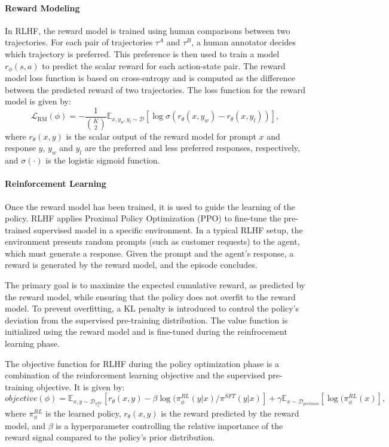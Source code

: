 \documentclass[master,english,final]{kaist-ucs}
\begin{document}
\paragraph{Reward Modeling}
In RLHF, the reward model is trained using human comparisons between two trajectories. For each pair of trajectories $\tau^A$ and $\tau^B$, a human annotator decides which trajectory is preferred. This preference is then used to train a model $r_\phi(s,a)$ to predict the scalar reward for each action-state pair. The reward model loss function is based on cross-entropy and is computed as the difference between the predicted reward of two trajectories. The loss function for the reward model is given by:
\[
\mathcal{L}_{\text{RM}}(\phi) = - \frac{1}{\binom{K}{2}} \mathbb{E}_{x, y_w, y_l \sim \mathcal{D}} \left[ \log \sigma(r_\theta(x, y_w) - r_\theta(x, y_l)) \right],
\]
where $r_\theta(x, y)$ is the scalar output of the reward model for prompt $x$ and response $y$, $y_w$ and $y_l$ are the preferred and less preferred responses, respectively, and $\sigma(\cdot)$ is the logistic sigmoid function.

\paragraph{Reinforcement Learning}
Once the reward model has been trained, it is used to guide the learning of the policy. RLHF applies Proximal Policy Optimization (PPO)\cite{schulman2017proximal} to fine-tune the pre-trained supervised model in a specific environment. In a typical RLHF setup, the environment presents random prompts (such as customer requests) to the agent, which must generate a response. Given the prompt and the agent's response, a reward is generated by the reward model, and the episode concludes.

The primary goal is to maximize the expected cumulative reward, as predicted by the reward model, while ensuring that the policy does not overfit to the reward model. To prevent overfitting, a KL penalty is introduced to control the policy's deviation from the supervised pre-training distribution. The value function is initialized using the reward model and is fine-tuned during the reinfrocement learning phase.

The objective function for RLHF during the policy optimization phase is a combination of the reinforcement learning objective and the supervised pre-training objective. It is given by:
\[
objective(\phi) = \mathbb{E}_{x, y\sim \mathcal{D}_{\pi_{\phi}^{RL}}} \left[ r_\theta(x,y)-\beta\log(\pi_\phi^{RL}(y|x)/\pi^{SFT}(y|x) \right] + \gamma \mathbb{E}_{x\sim \mathcal{D}_{pretrain}}\left[\log(\pi_\phi^{RL}(x) \right],
\]
where $\pi_\phi^{RL}$ is the learned policy, $r_\theta(x, y)$ is the reward predicted by the reward model, and $\beta$ is a hyperparameter controlling the relative importance of the reward signal compared to the policy's prior distribution.
\end{document}
